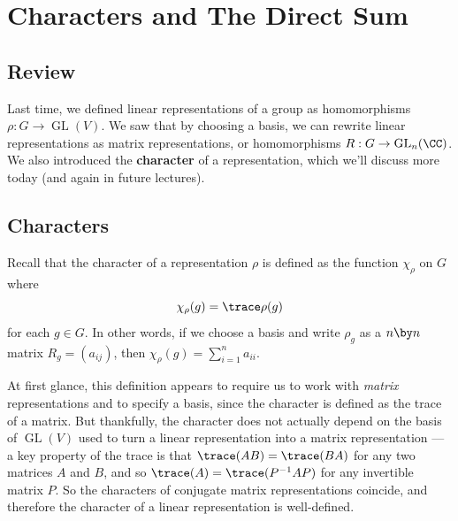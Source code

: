 


\section{Characters and The Direct Sum}

\subsection{Review}

Last time, we defined linear representations of a group as homomorphisms $\rho: G \to \operatorname{GL}(V)$. We saw that by choosing a basis, we can rewrite linear representations as matrix representations, or homomorphisms $R: G \to \operatorname{GL}_n(\CC)$. We also introduced the \textbf{character} of a representation, which we'll discuss more today (and again in future lectures). 

\subsection{Characters}


Recall that the character of a representation $\rho$ is defined as the function $\chi_\rho$ on $G$ where \[\chi_\rho(g) = \trace \rho(g)\] for each $g \in G$. In other words, if we choose a basis and write $\rho_g$ as a $n \by n$ matrix $R_g = (a_{ij})$, then $\chi_\rho(g) = \sum_{i = 1}^{n} a_{ii}$.

At first glance, this definition appears to require us to work with \emph{matrix} representations and to specify a basis, since the character is defined as the trace of a matrix. But thankfully, the character does not actually depend on the basis of $\operatorname{GL}(V)$ used to turn a linear representation into a matrix representation --- a key property of the trace is that $\trace(AB) = \trace(BA)$ for any two matrices $A$ and $B$, and so $\trace(A) = \trace(P^{-1}AP)$ for any invertible matrix $P$. So the characters of conjugate matrix representations coincide, and therefore the character of a linear representation is well-defined. 

